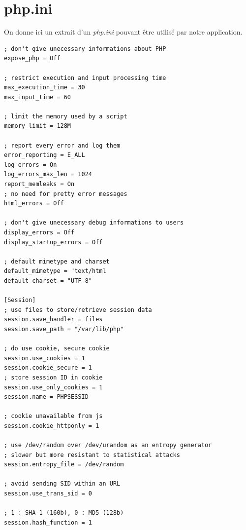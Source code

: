 \documentclass[a4paper]{article}
\begin{document}
\newpage
\appendix
\section{php.ini}
On donne ici un extrait d'un \textit{php.ini} pouvant être
utilisé par notre application.

\begin{verbatim}
; don't give unecessary informations about PHP
expose_php = Off

; restrict execution and input processing time
max_execution_time = 30
max_input_time = 60

; limit the memory used by a script
memory_limit = 128M

; report every error and log them
error_reporting = E_ALL
log_errors = On
log_errors_max_len = 1024
report_memleaks = On
; no need for pretty error messages
html_errors = Off

; don't give unecessary debug informations to users
display_errors = Off
display_startup_errors = Off

; default mimetype and charset
default_mimetype = "text/html
default_charset = "UTF-8"

[Session]
; use files to store/retrieve session data
session.save_handler = files
session.save_path = "/var/lib/php"

; do use cookie, secure cookie
session.use_cookies = 1
session.cookie_secure = 1
; store session ID in cookie
session.use_only_cookies = 1
session.name = PHPSESSID

; cookie unavailable from js
session.cookie_httponly = 1

; use /dev/random over /dev/urandom as an entropy generator
; slower but more resistant to statistical attacks
session.entropy_file = /dev/random

; avoid sending SID within an URL
session.use_trans_sid = 0

; 1 : SHA-1 (160b), 0 : MD5 (128b)
session.hash_function = 1
\end{verbatim}
\end{document}
